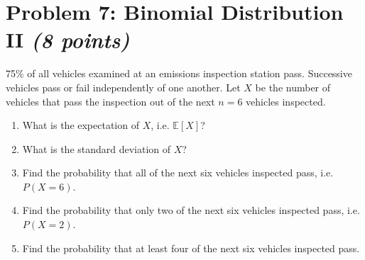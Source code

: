 \documentclass[11pt,twoside]{article}
\newcommand{\pts}[1]{\marginpar{ \small\hspace{0pt} \textit{[#1]} } }
\numberwithin{equation}{section}
\newcommand{\?}{\stackrel{?}{=}}
\begin{document}
 
 \eject

 \section*{Problem 7: Binomial Distribution II \textit{(8 points)}}
75\% of all vehicles examined at an emissions inspection station pass.
Successive vehicles pass or fail independently of one another. Let $X$ be the number of vehicles that pass the inspection out of the next $n=6$  vehicles inspected.

\begin{enumerate}[\bf (a)]
  \item What is the expectation of $X$, i.e. $\mathbb{E}[X]$? \pts{1}
 \vspace{10ex}

\item What is the standard deviation of $X$? \pts{1}
 
  \vspace{10ex}

\item Find the probability that all of the next six vehicles inspected pass, i.e. $P(X=6)$.\pts{1}

  \vspace{20ex}

  
\item Find the probability that only two of the next six vehicles inspected pass, i.e. $P(X=2)$.\pts{2}
 \vspace{25ex}
  
\item Find the probability that at least four of the next six vehicles inspected pass.\pts{3}
  \vspace{35ex}

  

  
\end{enumerate}

\eject
\end{document}
